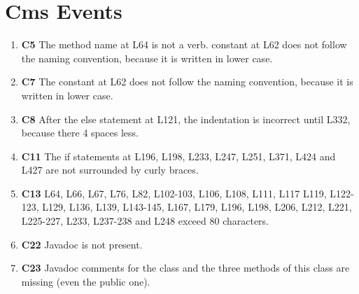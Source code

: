\section{Cms Events}
\begin{enumerate}
\item \textbf{C5} The method name at L64 is not a verb. constant at L62 does not follow the naming convention, because it is written in lower case.
\item \textbf{C7} The constant at L62 does not follow the naming convention, because it is written in lower case.
\item \textbf{C8} After the else statement at L121, the indentation is incorrect until L332, because there 4 spaces less.
\item \textbf{C11} The if statements at L196, L198, L233, L247, L251, L371, L424 and L427 are not surrounded by curly braces.
\item \textbf{C13} L64, L66, L67, L76, L82, L102-103, L106, L108, L111, L117 L119, L122-123, L129, L136, L139, L143-145, L167, L179, L196, L198, L206, L212, L221, L225-227, L233, L237-238 and L248 exceed 80 characters.
\item \textbf{C22} Javadoc is not present.
\item \textbf{C23} Javadoc comments for the class and the three methods of this class are missing (even the public one).
\end{enumerate}